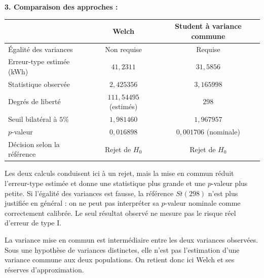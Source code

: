 {\begin{enumerate}
{\textbf{3. Comparaison des approches :}
\begin{center}
\begin{tabular}{|l|c|c|}\hline
 & Welch & Student à variance commune \\ \hline
Égalité des variances & Non requise & Requise \\
Erreur-type estimée (kWh) & $41{,}2311$ & $31{,}5856$ \\
Statistique observée & $2{,}425356$ & $3{,}165998$ \\
Degrés de liberté & $111{,}54495$ (estimés) & $298$ \\
Seuil bilatéral à $5\%$ & $1{,}981460$ & $1{,}967957$ \\
$p$-valeur & $0{,}016898$ & $0{,}001706$ (nominale) \\
Décision selon la référence & Rejet de $H_0$ & Rejet de $H_0$ \\ \hline
\end{tabular}
\end{center}
Les deux calculs conduisent ici à un rejet, mais la mise en commun réduit l'erreur-type estimée et donne une statistique plus grande et une $p$-valeur plus petite. Si l'égalité des variances est fausse, la référence $St(298)$ n'est plus justifiée en général : on ne peut pas interpréter sa $p$-valeur nominale comme correctement calibrée. Le seul résultat observé ne mesure pas le risque réel d'erreur de type I.

La variance mise en commun est intermédiaire entre les deux variances observées. Sous une hypothèse de variances distinctes, elle n'est pas l'estimation d'une variance commune aux deux populations. On retient donc ici Welch et ses réserves d'approximation.

}
\end{enumerate}}
